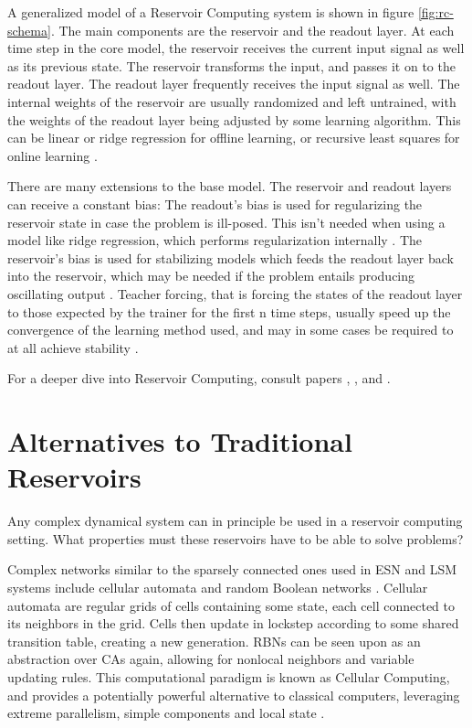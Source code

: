 A generalized model of a Reservoir Computing system is shown in figure \ref{fig:rc-schema}.
The main components are the reservoir and the readout layer.
At each time step in the core model,
the reservoir receives the current input signal as well as its previous state.
The reservoir transforms the input, and passes it on to the readout layer.
The readout layer frequently receives the input signal as well.
The internal weights of the reservoir are usually randomized and left untrained,
with the weights of the readout layer being adjusted by some learning algorithm.
This can be linear or ridge regression for offline learning,
or recursive least squares for online learning \cite{Schrauwen2007}.

There are many extensions to the base model.
The reservoir and readout layers can receive a constant bias:
The readout's bias is used for regularizing the reservoir state in case the problem is ill-posed.
This isn't needed when using a model like ridge regression, which performs regularization internally \cite{Schrauwen2007}.
The reservoir's bias is used for stabilizing models which feeds the readout layer back into the reservoir,
which may be needed if the problem entails producing oscillating output \cite{Jaeger:2007}.
Teacher forcing,
that is forcing the states of the readout layer to those expected by the trainer for the first n time steps,
usually speed up the convergence of the learning method used,
and may in some cases be required to at all achieve stability \cite{jaeger2002tutorial}.

For a deeper dive into Reservoir Computing,
consult papers \cite{Schrauwen2007}, \cite{lukovsevivcius2012reservoir}, and \cite{Jaeger:2007}.

\section{Alternatives to Traditional Reservoirs}

Any complex dynamical system can in principle be used in a reservoir computing setting.
What properties must these reservoirs have to be able to solve problems?

Complex networks similar to the sparsely connected ones used in ESN and LSM systems include cellular automata \cite{wolfram2002new} and random Boolean networks \cite{kauffman1969metabolic}.
Cellular automata are regular grids of cells containing some state,
each cell connected to its neighbors in the grid.
Cells then update in lockstep according to some shared transition table,
creating a new generation.
RBNs can be seen upon as an abstraction over CAs again,
allowing for nonlocal neighbors and variable updating rules.
This computational paradigm is known as Cellular Computing,
and provides a potentially powerful alternative to classical computers,
leveraging extreme parallelism, simple components and local state \cite{sipper1999emergence}.

